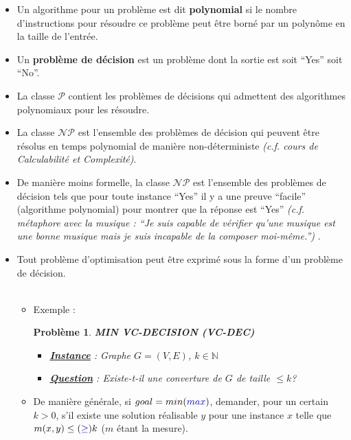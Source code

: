 \documentclass{article}
\newcommand{\titre}[1]{\textcolor{title}{#1}}
\newcommand{\blu}[1]{\textcolor{darkblue}{#1}}
\newcommand{\N}{\mathbb{N}}
\newtheorem{pbm}{Problème}[section]
\begin{document}
\begin{sffamily}
\begin{itemize}
\item Un algorithme pour un problème est dit \textbf{polynomial} si le nombre
d'instructions pour résoudre ce problème peut être borné par un polynôme en la
taille de l'entrée.
\item Un \textbf{problème de décision} est un problème dont la sortie est soit
``Yes'' soit ``No''.
\item La classe $\mathcal{P}$ contient les problèmes de décisions qui admettent
des algorithmes polynomiaux pour les résoudre.
\item La classe $\mathcal{NP}$ est l'ensemble des problèmes de décision qui
peuvent être résolus en temps polynomial de manière non-déterministe
\textit{(c.f. cours de Calculabilité et Complexité)}.
\item De manière moins formelle, la classe $\mathcal{NP}$ est l'ensemble des
problèmes de décision tels que pour toute instance ``Yes'' il y a une preuve
``facile'' (algorithme polynomial) pour montrer que la réponse est ``Yes''
\textit{(c.f. métaphore avec la musique : ``Je suis capable de vérifier qu'une
musique est une bonne musique mais je suis incapable de la composer moi-même.'')
}.
\item Tout problème d'optimisation peut être exprimé sous la forme d'un problème
de décision. \\$ $\\
\begin{itemize}
\item[$\rightarrow$] Exemple : \\
\indent \hbox{}
\begin{pbm}
\textbf{MIN VC-DECISION (\titre{VC-DEC})}
\begin{itemize}
\item[*]\textbf{\underline{Instance}} : Graphe $G=(V,E)$, $k \in \N$
\item[*]\textbf{\underline{Question}} : Existe-t-il une converture de $G$ de
taille $\leq k$?
\end{itemize}
\indent \hbox{}
\end{pbm}
\item[$\rightarrow$] De manière générale, si $goal=min(\blu{max})$, demander,
pour un certain $k>0$, s'il existe une solution réalisable
$y$ pour une instance $x$ telle que $m(x,y) \leq (\blu{\geq}) k$ ($m$ étant
la mesure).
\end{itemize}
\end{itemize}


\end{sffamily}
\end{document}
